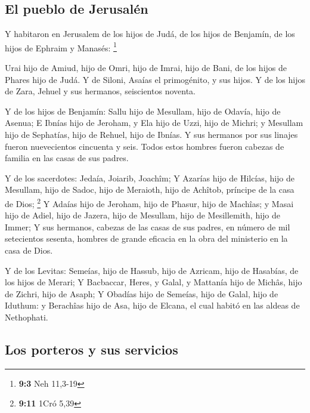 \hypertarget{el-pueblo-de-jerusaluxe9n}{%
\subsection{El pueblo de Jerusalén}\label{el-pueblo-de-jerusaluxe9n}}

 Y habitaron en Jerusalem de los hijos de Judá, de los
hijos de Benjamín, de los hijos de Ephraim y Manasés: \footnote{\textbf{9:3}
  Neh 11,3-19}

 Urai hijo de Amiud, hijo de Omri, hijo de Imrai, hijo de
Bani, de los hijos de Phares hijo de Judá.  Y de Siloni,
Asaías el primogénito, y sus hijos.  Y de los hijos de
Zara, Jehuel y sus hermanos, seiscientos noventa.

 Y de los hijos de Benjamín: Sallu hijo de Mesullam, hijo
de Odavía, hijo de Asenua;  E Ibnías hijo de Jeroham, y
Ela hijo de Uzzi, hijo de Michri; y Mesullam hijo de Sephatías, hijo de
Rehuel, hijo de Ibnías.  Y sus hermanos por sus linajes
fueron nuevecientos cincuenta y seis. Todos estos hombres fueron cabezas
de familia en las casas de sus padres.

 Y de los sacerdotes: Jedaía, Joiarib, Joachîm;
 Y Azarías hijo de Hilcías, hijo de Mesullam, hijo de
Sadoc, hijo de Meraioth, hijo de Achîtob, príncipe de la casa de Dios;
\footnote{\textbf{9:11} 1Cró 5,39}  Y Adaías hijo de
Jeroham, hijo de Phasur, hijo de Machîas; y Masai hijo de Adiel, hijo de
Jazera, hijo de Mesullam, hijo de Mesillemith, hijo de Immer;
 Y sus hermanos, cabezas de las casas de sus padres, en
número de mil setecientos sesenta, hombres de grande eficacia en la obra
del ministerio en la casa de Dios.

 Y de los Levitas: Semeías, hijo de Hassub, hijo de
Azricam, hijo de Hasabías, de los hijos de Merari;  Y
Bacbaccar, Heres, y Galal, y Mattanía hijo de Michâs, hijo de Zichri,
hijo de Asaph;  Y Obadías hijo de Semeías, hijo de Galal,
hijo de Iduthum: y Berachîas hijo de Asa, hijo de Elcana, el cual habitó
en las aldeas de Nethophati.

\hypertarget{los-porteros-y-sus-servicios}{%
\subsection{Los porteros y sus
servicios}\label{los-porteros-y-sus-servicios}}

